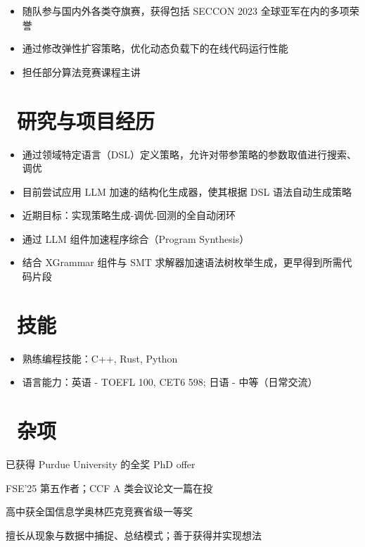\documentclass{resume}
\begin{document}
\begin{itemize}[parsep=0.5ex]
  \item 随队参与国内外各类夺旗赛，获得包括 SECCON 2023 全球亚军在内的多项荣誉
\end{itemize}

\begin{itemize}[parsep=0.5ex]
  \item 通过修改弹性扩容策略，优化动态负载下的在线代码运行性能
  \item 担任部分算法竞赛课程主讲
\end{itemize}

\section{\faCogs\ 研究与项目经历}

\begin{itemize}[parsep=0.5ex]
  \item 通过领域特定语言（DSL）定义策略，允许对带参策略的参数取值进行搜索、调优
  \item 目前尝试应用 LLM 加速的结构化生成器，使其根据 DSL 语法自动生成策略
  \item 近期目标：实现策略生成-调优-回测的全自动闭环
\end{itemize}

\begin{itemize}[parsep=0.5ex]
  \item 通过 LLM 组件加速程序综合（Program Synthesis）
  \item 结合 XGrammar 组件与 SMT 求解器加速语法树枚举生成，更早得到所需代码片段
\end{itemize}

\section{\faCogs\ 技能}
\begin{itemize}[parsep=0.5ex]
  \item 熟练编程技能：C++, Rust, Python
  \item 语言能力：英语 - TOEFL 100, CET6 598; 日语 - 中等（日常交流）
\end{itemize}

\section{\faInfo\ 杂项}
\begin{description}[parsep=0.5ex]
  \item[升学] 已获得 Purdue University 的全奖 PhD offer
  \item[论文] FSE'25 第五作者；CCF A 类会议论文一篇在投
  \item[竞赛] 高中获全国信息学奥林匹克竞赛省级一等奖
  \item[特长] 擅长从现象与数据中捕捉、总结模式；善于获得并实现想法
\end{description}
\end{document}
